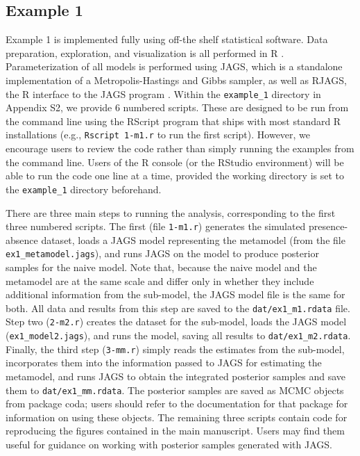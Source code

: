 \documentclass[11pt]{article}
\newcommand{\rev}[1]{{\color{RoyalBlue}#1}}
\begin{document}
\subsection*{Example 1}
\rev{
Example 1 is implemented fully using off-the shelf statistical software.
Data preparation, exploration, and visualization is all performed in R \citep{R}.
Parameterization of all models is performed using JAGS, which is a standalone implementation of a Metropolis-Hastings and Gibbs sampler, as well as RJAGS, the R interface to the JAGS program \citep{RJAGS}.
Within the {\tt example\_1} directory in Appendix S2, we provide 6 numbered scripts.
These are designed to be run from the command line using the RScript program that ships with most standard R installations (e.g., {\tt Rscript 1-m1.r} to run the first script).
However, we encourage users to review the code rather than simply running the examples from the command line.
Users of the R console (or the RStudio environment) will be able to run the code one line at a time, provided the working directory is set to the {\tt example\_1} directory beforehand.

There are three main steps to running the analysis, corresponding to the first three numbered scripts.
The first (file {\tt 1-m1.r}) generates the simulated presence-absence dataset, loads a JAGS model representing the metamodel (from the file {\tt ex1\_metamodel.jags}), and runs JAGS on the model to produce posterior samples for the naive model.
Note that, because the naive model and the metamodel are at the same scale and differ only in whether they include additional information from the sub-model, the JAGS model file is the same for both.
All data and results from this step are saved to the {\tt dat/ex1\_m1.rdata} file.
Step two ({\tt 2-m2.r}) creates the dataset for the sub-model, loads the JAGS model ({\tt ex1\_model2.jags}), and runs the model, saving all results to {\tt dat/ex1\_m2.rdata}.
Finally, the third step ({\tt 3-mm.r}) simply reads the estimates from the sub-model, incorporates them into the information passed to JAGS for estimating the metamodel, and runs JAGS to obtain the integrated posterior samples and save them to {\tt dat/ex1\_mm.rdata}.
The posterior samples are saved as MCMC objects from package coda; users should refer to the documentation for that package for information on using these objects.
The remaining three scripts contain code for reproducing the figures contained in the main manuscript.
Users may find them useful for guidance on working with posterior samples generated with JAGS.
}
\end{document}
